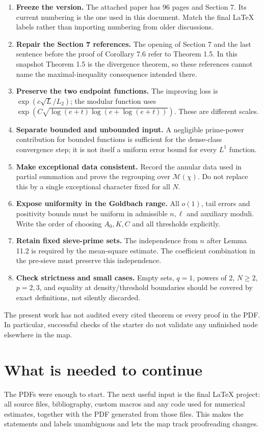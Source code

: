 \documentclass[11pt]{article}
\newcommand{\page}{\newpage}
\begin{document}
\begin{enumerate}
\item \textbf{Freeze the version.} The attached paper has 96 pages and Section 7.
Its current numbering is the one used in this document. Match the final LaTeX
labels rather than importing numbering from older discussions.
\item \textbf{Repair the Section 7 references.} The opening of Section 7 and the
last sentence before the proof of Corollary 7.6 refer to Theorem 1.5. In this
snapshot Theorem 1.5 is the divergence theorem, so these references cannot name
the maximal-inequality consequence intended there.
\item \textbf{Preserve the two endpoint functions.} The improving loss is
\(\exp(c\sqrt{L}/L_2)\); the modular function uses
\(\exp(C\sqrt{\log(e+t)\log(e+\log(e+t))})\). These are different scales.
\item \textbf{Separate bounded and unbounded input.} A negligible prime-power
contribution for bounded functions is sufficient for the dense-class convergence
step; it is not itself a uniform error bound for every \(L^1\) function.
\item \textbf{Make exceptional data consistent.} Record the annular data used in
partial summation and prove the regrouping over \(\mathcal M(\chi)\). Do not
replace this by a single exceptional character fixed for all \(N\).
\item \textbf{Expose uniformity in the Goldbach range.} All \(o(1)\), tail errors
and positivity bounds must be uniform in admissible \(n,\ell\) and auxiliary
moduli. Write the order of choosing \(A_0,K,C\) and all thresholds explicitly.
\item \textbf{Retain fixed sieve-prime sets.} The independence from \(n\) after
Lemma 11.2 is required by the mean-square estimate. The coefficient combination
in the pre-sieve must preserve this independence.
\item \textbf{Check strictness and small cases.} Empty sets, \(q=1\), powers of 2,
\(N\ge2\), \(p=2,3\), and equality at density/threshold boundaries should be
covered by exact definitions, not silently discarded.
\end{enumerate}

The present work has not audited every cited theorem or every proof in the PDF.
In particular, successful checks of the starter do not validate any unfinished
node elsewhere in the map.

\page
\section{What is needed to continue}
The PDFs were enough to start. The next useful input is the final LaTeX project:
all source files, bibliography, custom macros and any code used for numerical
estimates, together with the PDF generated from those files. This makes the
statements and labels unambiguous and lets the map track proofreading changes.
\end{document}

